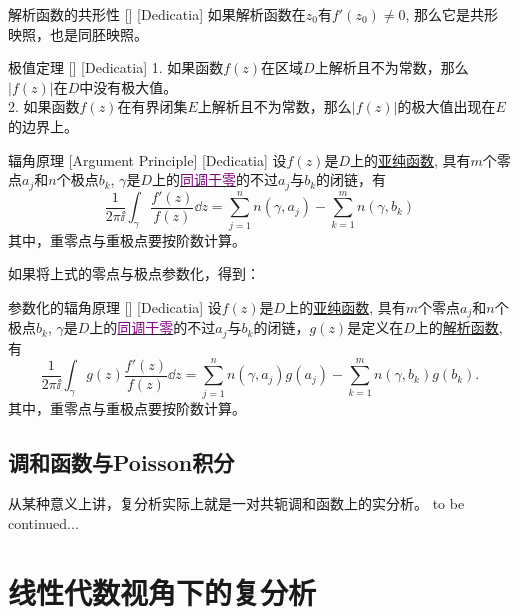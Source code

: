 \documentclass[UTF8]{ctexart}
\newcommand{\hyperrefc}[2]{\hyperref[#1]{\textcolor{purple}{#2}}}
\newcommand{\continued}{{\Large to be continued...}}
\newcommand{\AnalyticalFunction}{\hyperref[dfn:AnalyticalFunction]{解析函数}}
\newcommand{\MeromorphicFunction}{\hyperref[dfn:MeromorphicFunction]{亚纯函数}}
\begin{document}
\begin{crl}
    [UUID]
    {解析函数的共形性}
    []
    [Dedicatia]
    如果解析函数在$z_0$有$f'(z_0)\neq 0$, 那么它是共形映照，也是同胚映照。
\end{crl}
\begin{thm}
    [UUID]
    {极值定理}
    []
    [Dedicatia]
    1. 如果函数$f(z)$在区域$D$上解析且不为常数，那么$|f(z)|$在$D$中没有极大值。\\
    2. 如果函数$f(z)$在有界闭集$E$上解析且不为常数，那么$|f(z)|$的极大值出现在$E$的边界上。
\end{thm}
\begin{crl}
    [UUID]
    {辐角原理}
    [Argument Principle]
    [Dedicatia]
    设$f(z)$是$D$上的\MeromorphicFunction , 具有$m$个零点$a_j$和$n$个极点$b_k$, $\gamma$是$D$上的\hyperrefc{dfn:NullHomologous}{同调于零}的不过$a_j$与$b_k$的闭链，有
    \[\frac{1}{2\pi\ii}\int_\gamma\frac{f'(z)}{f(z)}\dd{z}=\sum_{j = 1}^{n} n(\gamma,a_j)-\sum_{k = 1}^{m} n(\gamma,b_k)  \]
    其中，重零点与重极点要按阶数计算。
\end{crl}
如果将上式的零点与极点参数化，得到：
\begin{crl}
    [UUID]
    {参数化的辐角原理}
    []
    [Dedicatia]
    设$f(z)$是$D$上的\MeromorphicFunction , 具有$m$个零点$a_j$和$n$个极点$b_k$, $\gamma$是$D$上的\hyperrefc{dfn:NullHomologous}{同调于零}的不过$a_j$与$b_k$的闭链，$g(z)$是定义在$D$上的\AnalyticalFunction , 有
    \[\frac{1}{2\pi\ii}\int_\gamma g(z)\frac{f'(z)}{f(z)}\dd{z}=\sum_{j = 1}^{n} n(\gamma,a_j)g(a_j)-\sum_{k = 1}^{m} n(\gamma,b_k)g(b_k).  \]
    其中，重零点与重极点要按阶数计算。
\end{crl}
\subsection{调和函数与Poisson积分}
从某种意义上讲，复分析实际上就是一对共轭调和函数上的实分析。
\continued

\section{线性代数视角下的复分析}
\end{document}
